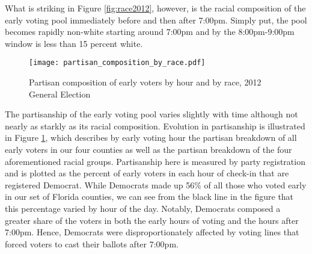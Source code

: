 \documentclass[12pt,titlepage]{article}
\begin{document}




What is striking in Figure \ref{fig:race2012}, however, is the racial
composition of the early voting pool immediately before and then after
7:00pm.  Simply put, the pool becomes rapidly non-white starting
around 7:00pm and by the 8:00pm-9:00pm window is less than 15 percent
white.

\begin{figure}[!ht]
\caption{Partisan composition of early voters by hour and by race, 2012
  General Election}
  \label{fig:party2012}
  \centering
    \centering\texttt{[image: partisan\_composition\_by\_race.pdf]}
\end{figure}

The partisanship of the early voting pool varies slightly with time
although not nearly as starkly as its racial composition.  Evolution
in partisanship is illustrated in Figure \ref{fig:party2012}, which
describes by early voting hour the partisan breakdown of all early
voters in our four counties as well as the partisan breakdown of the
four aforementioned racial groups.  Partisanship here is measured by
party registration and is plotted as the percent of early voters in
each hour of check-in that are registered Democrat.  While Democrats
made up 56\% of all those who voted early in our set of Florida
counties, we can see from the black line in the figure that this
percentage varied by hour of the day.  Notably, Democrats composed a
greater share of the voters in both the early hours of voting and the
hours after 7:00pm.  Hence, Democrats were disproportionately affected
by voting lines that forced voters to cast their ballots after 7:00pm.
\end{document}
